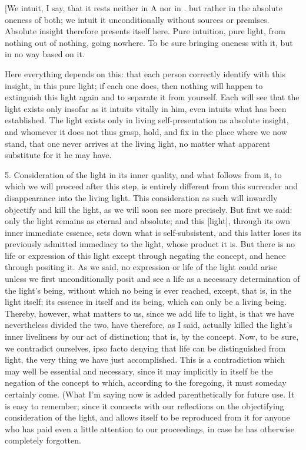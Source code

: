 [We intuit, I say, that it rests neither in A nor in .
but rather in the absolute oneness of both;
we intuit it unconditionally without sources or premises.
Absolute insight therefore presents itself here.
Pure intuition, pure light,
from nothing out of nothing, going nowhere.
To be sure bringing oneness with it,
but in no way based on it.

Here everything depends on this:
that each person correctly identify
with this insight, in this pure light;
if each one does, then nothing will happen
to extinguish this light again
and to separate it from yourself.
Each will see that the light exists only
insofar as it intuits vitally in him,
even intuits what has been established.
The light exists only in living
self-presentation as absolute insight,
and whomever it does not thus grasp,
hold, and fix in the place where we now stand,
that one never arrives at the living light,
no matter what apparent substitute for it he may have.

5. Consideration of the light in its inner quality,
and what follows from it,
to which we will proceed after this step,
is entirely different from this
surrender and disappearance into the living light.
This consideration as such will inwardly
objectify and kill the light,
as we will soon see more precisely.
But first we said:
only the light remains as eternal and absolute;
and this [light], through its own inner immediate essence,
sets down what is self-subsistent,
and this latter loses its previously admitted
immediacy to the light, whose product it is.
But there is no life or expression of this light
except through negating the concept, and hence through positing it.
As we said, no expression or life of the light could arise
unless we first unconditionally posit and see a life as
a necessary determination of the light’s being,
without which no being is ever reached, except,
that is, in the light itself;
its essence in itself and its being,
which can only be a living being.
Thereby, however, what matters to us,
since we add life to light, is
that we have nevertheless divided the two,
have therefore, as I said, actually killed
the light’s inner liveliness
by our act of distinction;
that is, by the concept.
Now, to be sure, we contradict ourselves,
ipso facto denying that life can be distinguished from light,
the very thing we have just accomplished.
This is a contradiction which may well be essential and necessary,
since it may implicitly in itself be the negation of
the concept to which, according to the foregoing,
it must someday certainly come.
(What I’m saying now is added parenthetically for future use.
It is easy to remember;
since it connects with our reflections on
the objectifying consideration of the light,
and allows itself to be reproduced from it
for anyone who has paid even a little attention
to our proceedings, in case he has otherwise completely forgotten.

